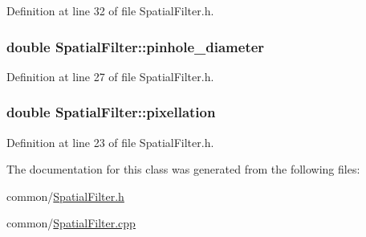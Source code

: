 Definition at line 32 of file SpatialFilter.h.

\hypertarget{classSpatialFilter_a814c422d8e4035e04fdbf8fd1472b8a0}{
\subsubsection[{pinhole\_\-diameter}]{\setlength{\rightskip}{0pt plus 5cm}double {\bf SpatialFilter::pinhole\_\-diameter}}}
\label{classSpatialFilter_a814c422d8e4035e04fdbf8fd1472b8a0}


Definition at line 27 of file SpatialFilter.h.

\hypertarget{classSpatialFilter_a7e72d04208866a30a7910f8871d6c716}{
\subsubsection[{pixellation}]{\setlength{\rightskip}{0pt plus 5cm}double {\bf SpatialFilter::pixellation}}}
\label{classSpatialFilter_a7e72d04208866a30a7910f8871d6c716}


Definition at line 23 of file SpatialFilter.h.



The documentation for this class was generated from the following files:\begin{DoxyCompactItemize}
\item 
common/\hyperlink{SpatialFilter_8h}{SpatialFilter.h}\item 
common/\hyperlink{SpatialFilter_8cpp}{SpatialFilter.cpp}\end{DoxyCompactItemize}
